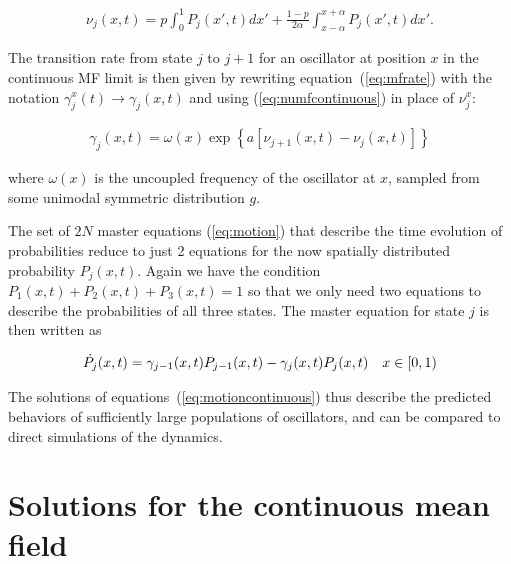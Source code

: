 \begin{align}
  \nu_j(x,t) = p \int_0^1 P_j(x',t)dx' + \frac{1-p}{2\alpha}\int_{x-\alpha}^{x+\alpha} P_j(x',t)dx'.
  \label{eq:numfcontinuous}
\end{align}

\noindent The transition rate from state $j$ to $j+1$ for an oscillator at position $x$ in the continuous MF limit is then given by
rewriting equation~(\ref{eq:mfrate}) with the notation $\gamma^x_j(t) \to \gamma_j(x,t)$ and using (\ref{eq:numfcontinuous}) in place
of $\nu^x_j$:

\begin{align}
  \gamma_j(x,t) = \omega(x) \exp\left\{ a\left[ \nu_{j+1}(x,t) - \nu_j(x,t) \right] \right\}
  \label{eq:ratecontinuous}
\end{align}

\noindent where $\omega(x)$ is the uncoupled frequency of the oscillator at $x$, sampled from some unimodal symmetric distribution $g$.

The set of $2N$ master equations (\ref{eq:motion}) that describe the time evolution of probabilities reduce to just 2 equations for the
now spatially distributed probability $P_j(x,t)$. Again we have the condition $P_1(x,t) + P_2(x,t) + P_3(x,t)=1$ so that we only need
two equations to describe the probabilities of all three states. The master equation for state $j$ is then written as

\begin{align}
  \dot{P_j}(x,t) &= \gamma_{j-1}(x,t)P_{j-1}(x,t) - \gamma_j(x,t)P_j(x,t) & x\in[0,1)
  \label{eq:motioncontinuous}
\end{align}

The solutions of equations~(\ref{eq:motioncontinuous}) thus describe the predicted behaviors of sufficiently large populations of
oscillators, and can be compared to direct simulations of the dynamics.

\section{Solutions for the continuous mean field}

